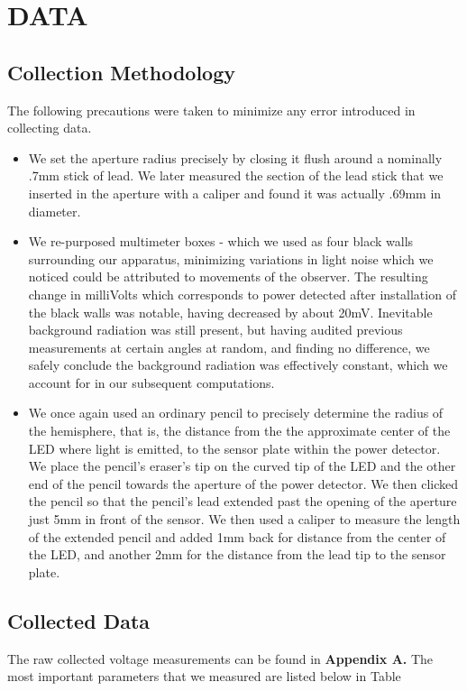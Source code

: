 \section{DATA}
\subsection{Collection Methodology}
The following precautions were taken to minimize any error introduced in collecting data.

\begin{itemize}
    \item We set the aperture radius precisely by closing it flush around a nominally .7mm stick of lead. We later measured the section of the lead stick that we inserted in the aperture with a caliper and found it was actually .69mm in diameter.
    \item We re-purposed multimeter boxes - which we used as four black walls surrounding our apparatus, minimizing variations in light noise which we noticed could be attributed to movements of the observer. The resulting change in milliVolts which corresponds to power detected after installation of the black walls was notable, having decreased by about 20mV. Inevitable background radiation was still present, but having audited previous measurements at certain angles at random, and finding no difference, we safely conclude the background radiation was effectively constant, which we account for in our subsequent computations.
    \item We once again used an ordinary pencil to precisely determine the radius of the hemisphere, that is, the distance from the the approximate center of the LED where light is emitted, to the sensor plate within the power detector. We place the pencil's eraser's tip on the curved tip of the LED and the other end of the pencil towards the aperture of the power detector. We then clicked the pencil so that the pencil's lead extended past the opening of the aperture just 5mm in front of the sensor. We then used a caliper to measure the length of the extended pencil and added 1mm back for distance from the center of the LED, and another 2mm for the distance from the lead tip to the sensor plate.
\end{itemize}

\newpage
\subsection{Collected Data}
The raw collected voltage measurements can be found in \textbf{Appendix A.} The most important parameters that we measured are listed below in Table %

